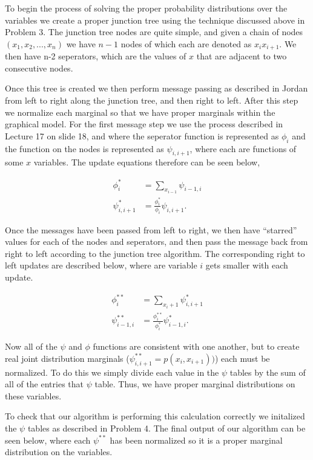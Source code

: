 \documentclass[paper=a4, fontsize=11pt]{scrartcl} %
\begin{document}
To begin the process of solving the proper probability distributions over the variables we create a proper junction tree using the technique discussed above in Problem 3.
The junction tree nodes are quite simple, and given a chain of nodes $(x_1,x_2,...,x_n)$ we have $n-1$ nodes of which each are denoted as $x_{i}x_{i+1}$.
We then have n-2 seperators, which are the values of $x$ that are adjacent to two consecutive nodes.

Once this tree is created we then perform message passing as described in Jordan from left to right along the junction tree, and then right to left.
After this step we normalize each marginal so that we have proper marginals within the graphical model.
For the first message step we use the process described in Lecture 17 on slide 18, and where the seperator function is represented as $\phi_i$ and the function on the nodes is represented as $\psi_{i,i+1}$, where each are functions of some $x$ variables.
The update equations therefore can be seen below,

\begin{align}
\phi_i^* &= \sum_{x_{i-1}} \psi_{i-1,i} \\
\psi_{i,i+1}^* &= \frac{\phi_i^*}{\phi_i}\psi_{i,i+1}.
\end{align}

Once the messages have been passed from left to right, we then have ``starred'' values for each of the nodes and seperators, and then pass the message back from right to left according to the junction tree algorithm.
The corresponding right to left updates are described below, where are variable $i$ gets smaller with each update.

\begin{align}
\phi_i^{**} &= \sum_{x_{i}+1} \psi_{i,i+1}^{*} \\
\psi_{i-1,i}^{**} &= \frac{\phi_i^{**}}{\phi_i^*}\psi_{i-1,i}^*.
\end{align}

Now all of the $\psi$ and  $\phi$ functions are consistent with one another, but to create real joint distribution marginals ($\psi^{**}_{i,i+1} = p(x_i,x_{i+1}))$) each must be normalized.
To do this we simply divide each value in the $\psi$ tables by the sum of all of the entries that $\psi$ table.
Thus, we have proper marginal distributions on these variables.

To check that our algorithm is performing this calculation correctly we initalized the $\psi$ tables as described in Problem 4.
The final output of our algorithm can be seen below, where each $\psi^{**}$ has been normalized so it is a proper marginal distribution on the variables.
\end{document}
